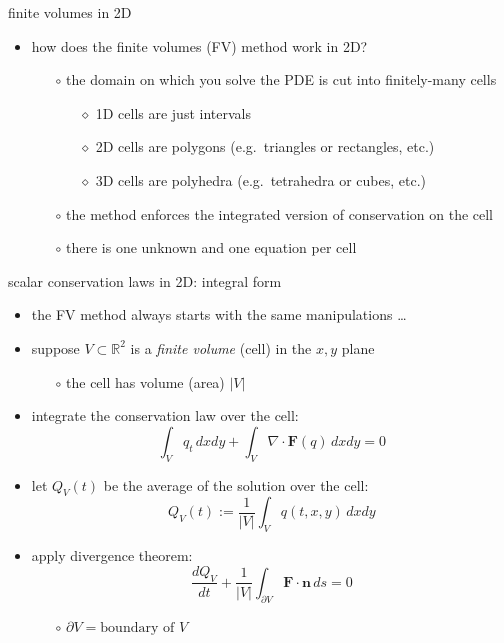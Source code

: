 \documentclass[10pt,dvipsnames,usepdftitle=false,
hyperref={pdftitle = {Finite volume methods},
    pdfauthor = {Ed Bueler}}]{beamer}
\newcommand{\bn}{\mathbf{n}}
\newcommand{\bF}{\mathbf{F}}
\newcommand{\Div}{\nabla\cdot}
\newcommand{\RR}{\mathbb{R}}
\begin{document}
\begin{frame}{finite volumes in 2D}

\begin{itemize}
\item how does the finite volumes (FV) method work in 2D?
    \begin{itemize}
    \item[$\circ$] the domain on which you solve the PDE is cut into finitely-many cells
	    \begin{itemize}
	    \item[$\diamond$] 1D cells are just intervals
	    \item[$\diamond$] 2D cells are polygons (e.g.~triangles or rectangles, etc.)
	    \item[$\diamond$] 3D cells are polyhedra (e.g.~tetrahedra or cubes, etc.)
	    \end{itemize}
    \item[$\circ$] the method enforces the integrated version of conservation on the cell
    \item[$\circ$] there is one unknown and one equation per cell
    \end{itemize}
\end{itemize}
\end{frame}


\begin{frame}{scalar conservation laws in 2D: integral form}

\begin{itemize}
\item the FV method always starts with the same manipulations \dots
\item suppose $V \subset \RR^2$ is a \emph{finite volume} (cell) in the $x,y$ plane
    \begin{itemize}
    \item[$\circ$] the cell has volume (area) $|V|$
    \end{itemize}
\item integrate the conservation law over the cell:
    $$\int_V q_t\,dx dy + \int_V \Div \bF(q)\,dx dy = 0$$
\item let $Q_V(t)$ be the average of the solution over the cell:
    $$Q_V(t) := \frac{1}{|V|} \int_V q(t,x,y)\,dx dy$$
\item apply divergence theorem:
    $$\frac{dQ_V}{dt} + \frac{1}{|V|} \int_{\partial V} \bF\cdot \bn\,ds = 0$$

    \begin{itemize}
    \item[$\circ$] $\partial V = \text{boundary of } V$
    \end{itemize}
\end{itemize}
\end{frame}
\end{document}
